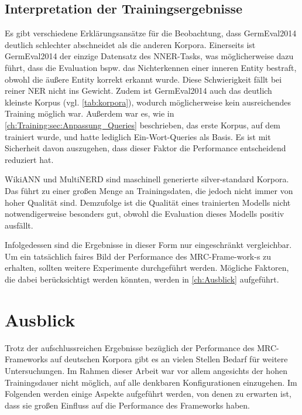 \section{Interpretation der Trainingsergebnisse}
\label{ch:Evaluation:sec:Interpretation_der_Trainingsergebnisse}

Es gibt verschiedene Erklärungsansätze für die Beobachtung, dass GermEval2014 deutlich schlechter abschneidet als die anderen Korpora. Einerseits ist GermEval2014 der einzige Datensatz des NNER-Tasks, was möglicherweise dazu führt, dass die Evaluation bspw. das Nichterkennen einer inneren Entity bestraft, obwohl die äußere Entity korrekt erkannt wurde. Diese Schwierigkeit fällt bei reiner NER nicht ins Gewicht. Zudem ist GermEval2014 auch das deutlich kleinste Korpus (vgl. \autoref{tab:korpora}), wodurch möglicherweise kein ausreichendes Training möglich war. Außerdem war es, wie in \autoref{ch:Training:sec:Anpassung_Queries} beschrieben, das erste Korpus, auf dem trainiert wurde, und hatte lediglich Ein-Wort-Queries als Basis. Es ist mit Sicherheit davon auszugehen, dass dieser Faktor die Performance entscheidend reduziert hat.

WikiANN und MultiNERD sind maschinell generierte silver-standard Korpora. Das führt zu einer großen Menge an Trainingsdaten, die jedoch nicht immer von hoher Qualität sind. Demzufolge ist die Qualität eines trainierten Modells nicht notwendigerweise besonders gut, obwohl die Evaluation dieses Modells positiv ausfällt.

Infolgedessen sind die Ergebnisse in dieser Form nur eingeschränkt vergleichbar. Um ein tatsächlich faires Bild der Performance des MRC\--Frame-work-s zu erhalten, sollten weitere Experimente durchgeführt werden. Mögliche Faktoren, die dabei berücksichtigt werden könnten, werden in \autoref{ch:Ausblick} aufgeführt.

\chapter{Ausblick}
\label{ch:Ausblick}

Trotz der aufschlussreichen Ergebnisse bezüglich der Performance des MRC\--Frame\-work\-s auf deutschen Korpora gibt es an vielen Stellen Bedarf für weitere Untersuchungen. Im Rahmen dieser Arbeit war vor allem angesichts der hohen Trainingsdauer nicht möglich, auf alle denkbaren Konfigurationen einzugehen. Im Folgenden werden einige Aspekte aufgeführt werden, von denen zu erwarten ist, dass sie großen Einfluss auf die Performance des Frameworks haben.

